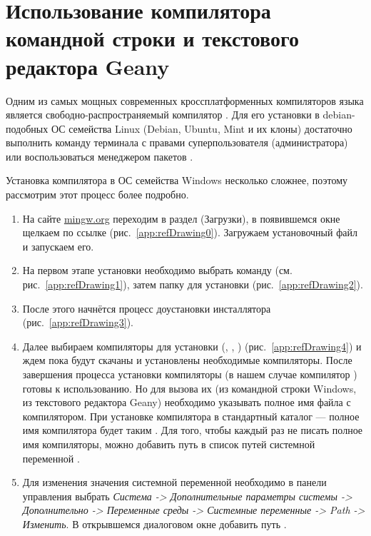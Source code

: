\chapter[Использование компилятора командной строки]{Использование компилятора командной строки и текстового редактора Geany}
Одним из самых мощных современных кроссплатформенных компиляторов языка  является свободно-распространяемый
компилятор . Для его установки в debian-подобных ОС семейства Linux (Debian, Ubuntu, Mint и их клоны) достаточно
выполнить команду терминала  с правами суперпользователя (администратора) или
воспользоваться менеджером пакетов .

Установка компилятора  в ОС семейства Windows несколько сложнее, поэтому  рассмотрим этот процесс более подробно.

\begin{enumerate}
\item На сайте \url{mingw.org} переходим в раздел  (Загрузки), в появившемся окне щелкаем по ссылке
 (рис.~\ref{app:refDrawing0}). Загружаем установочный файл и запускаем его.
\item На первом этапе установки необходимо выбрать команду  (см. рис.~\ref{app:refDrawing1}), затем
папку для установки (рис.~\ref{app:refDrawing2}).
\item После этого начнётся процесс доустановки инсталлятора (рис.~\ref{app:refDrawing3}).
\item Далее выбираем компиляторы для установки (, , ) (рис.~\ref{app:refDrawing4}) и ждем пока будут
скачаны и установлены необходимые компиляторы. После завершения процесса установки компиляторы (в нашем случае
компилятор ) готовы к использованию. Но для вызова их (из командной строки Windows, из текстового редактора Geany)
необходимо указывать полное имя файла с компилятором. При установке компилятора  в стандартный каталог
 --- полное имя компилятора  будет таким
. Для того, чтобы каждый раз не писать полное имя
компиляторы, можно добавить путь   в список путей системной
переменной .
\item Для изменения значения системной переменной  необходимо в панели управления выбрать \emph{Система ->
Дополнительные параметры системы -> Дополнительно -> Переменные среды -> Системные переменные -> Path -> Изменить}. В
открывшемся диалоговом окне добавить путь .
\end{enumerate}

